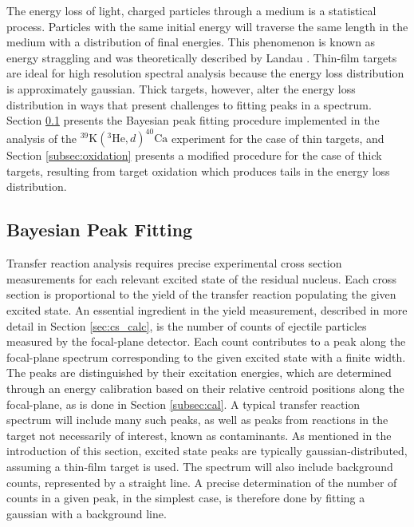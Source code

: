 The energy loss of light, charged particles through a medium is a statistical process. Particles with the same initial energy will traverse the same length in the medium with a distribution of final energies. This phenomenon is known as energy straggling and was theoretically described by Landau \cite{Landau1944}. Thin-film targets are ideal for high resolution spectral analysis because the energy loss distribution is approximately gaussian. Thick targets, however, alter the energy loss distribution in ways that present challenges to fitting peaks in a spectrum. Section \ref{subsec:peak_fitting_gaus} presents the Bayesian peak fitting procedure implemented in the analysis of the $^{39}\mathrm{K}(^{3}\mathrm{He}, d)^{40}\mathrm{Ca}$ experiment for the case of thin targets, and Section \ref{subsec:oxidation} presents a modified procedure for the case of thick targets, resulting from target oxidation which produces tails in the energy loss distribution.

\subsection{Bayesian Peak Fitting} \label{subsec:peak_fitting_gaus}

Transfer reaction analysis requires precise experimental cross section measurements for each relevant excited state of the residual nucleus. Each cross section is proportional to the yield of the transfer reaction populating the given excited state. An essential ingredient in the yield measurement, described in more detail in Section \ref{sec:cs_calc}, is the number of counts of ejectile particles measured by the focal-plane detector. Each count contributes to a peak along the focal-plane spectrum corresponding to the given excited state with a finite width. The peaks are distinguished by their excitation energies, which are determined through an energy calibration based on their relative centroid positions along the focal-plane, as is done in Section \ref{subsec:cal}. A typical transfer reaction spectrum will include many such peaks, as well as peaks from reactions in the target not necessarily of interest, known as contaminants. As mentioned in the introduction of this section, excited state peaks are typically gaussian-distributed, assuming a thin-film target is used. The spectrum will also include background counts, represented by a straight line. A precise determination of the number of counts in a given peak, in the simplest case, is therefore done by fitting a gaussian with a background line.

